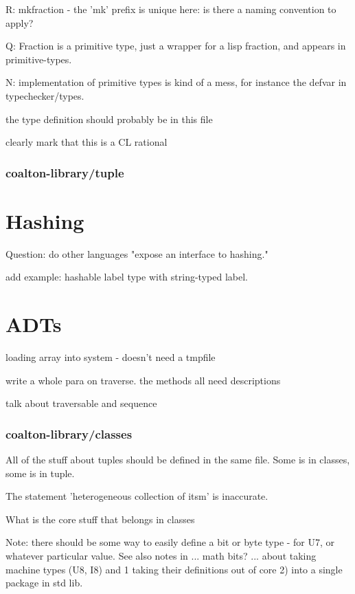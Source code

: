 \documentclass[12pt]{article}
\begin{document}
R: mkfraction - the 'mk' prefix is unique here: is there a naming convention to apply?

Q: Fraction is a primitive type, just a wrapper for a lisp fraction, and appears in primitive-types.

N: implementation of primitive types is kind of a mess, for instance
the defvar in typechecker/types.

the type definition should probably be in this file

clearly mark that this is a CL rational

\subsubsection{coalton-library/tuple}

\section{Hashing}

Question: do other languages "expose an interface to hashing."

 add example: hashable label type with string-typed label.

\section{ADTs}

loading array into system - doesn't need a tmpfile

write a whole para on traverse. the methods all need descriptions

talk about traversable and sequence

\subsubsection{coalton-library/classes}

All of the stuff about tuples should be defined in the same file. Some
is in classes, some is in tuple.

The statement 'heterogeneous collection of itsm' is inaccurate.

What is the core stuff that belongs in classes

Note: there should be some way to easily define a bit or byte type -
for U7, or whatever particular value. See also notes in ... math bits?
... about taking machine types (U8, I8) and 1 taking their definitions
out of core 2) into a single package in std lib.
\end{document}
